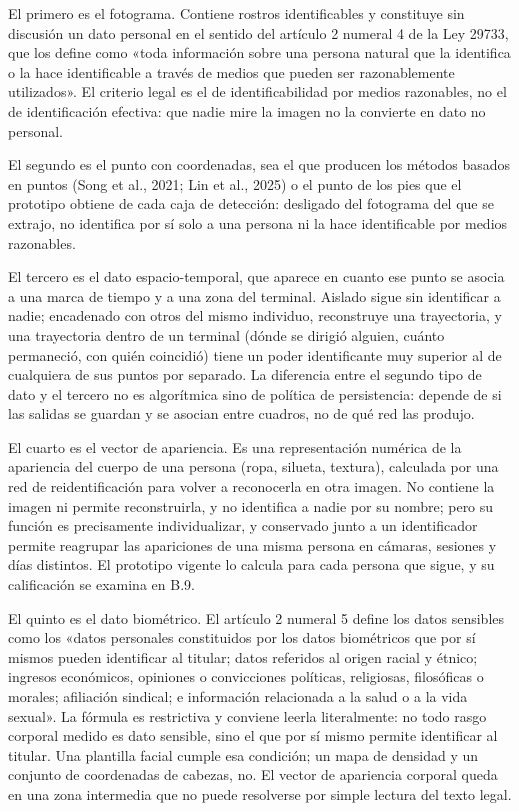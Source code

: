El primero es el fotograma. Contiene rostros identificables y constituye
sin discusión un dato personal en el sentido del artículo 2 numeral 4 de
la Ley 29733, que los define como «toda información sobre una persona
natural que la identifica o la hace identificable a través de medios que
pueden ser razonablemente utilizados». El criterio legal es el de
identificabilidad por medios razonables, no el de identificación
efectiva: que nadie mire la imagen no la convierte en dato no personal.

El segundo es el punto con coordenadas, sea el que producen los métodos
basados en puntos (Song et al., 2021; Lin et al., 2025) o el punto de los pies
que el prototipo obtiene de cada caja de detección: desligado del fotograma
del que se extrajo, no identifica por sí solo a una persona ni la hace
identificable por medios razonables.

El tercero es el dato espacio-temporal, que aparece en cuanto ese punto
se asocia a una marca de tiempo y a una zona del terminal. Aislado sigue
sin identificar a nadie; encadenado con otros del mismo individuo,
reconstruye una trayectoria, y una trayectoria dentro de un terminal
(dónde se dirigió alguien, cuánto permaneció, con quién coincidió) tiene
un poder identificante muy superior al de cualquiera de sus puntos por
separado. La diferencia entre el segundo tipo de dato y el tercero no es
algorítmica sino de política de persistencia: depende de si las salidas
se guardan y se asocian entre cuadros, no de qué red las produjo.

El cuarto es el vector de apariencia. Es una representación numérica de la
apariencia del cuerpo de una persona (ropa, silueta, textura), calculada por
una red de reidentificación para volver a reconocerla en otra imagen. No
contiene la imagen ni permite reconstruirla, y no identifica a nadie por su
nombre; pero su función es precisamente individualizar, y conservado junto a
un identificador permite reagrupar las apariciones de una misma persona en
cámaras, sesiones y días distintos. El prototipo vigente lo calcula para cada
persona que sigue, y su calificación se examina en B.9.

El quinto es el dato biométrico. El artículo 2 numeral 5 define los
datos sensibles como los «datos personales constituidos por los datos
biométricos que por sí mismos pueden identificar al titular; datos
referidos al origen racial y étnico; ingresos económicos, opiniones o
convicciones políticas, religiosas, filosóficas o morales; afiliación
sindical; e información relacionada a la salud o a la vida sexual». La
fórmula es restrictiva y conviene leerla literalmente: no todo rasgo
corporal medido es dato sensible, sino el que por sí mismo permite
identificar al titular. Una plantilla facial cumple esa condición; un
mapa de densidad y un conjunto de coordenadas de cabezas, no. El vector de
apariencia corporal queda en una zona intermedia que no puede resolverse por
simple lectura del texto legal.

